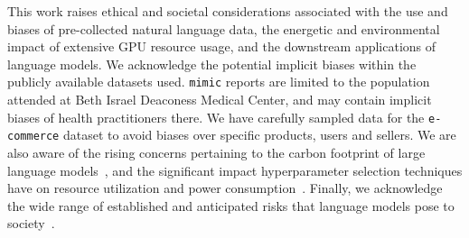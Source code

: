 \documentclass{article}
\begin{document}
This work raises ethical and societal considerations associated with
the use and biases of pre-collected natural language data,
the energetic and environmental impact of extensive GPU resource usage,
and the downstream applications of language models.
%
We acknowledge the potential implicit biases within the publicly available datasets used.
\Eg \texttt{mimic} reports are limited to the population attended at Beth Israel Deaconess Medical Center,
and may contain implicit biases of health practitioners there.
We have carefully sampled data for the \texttt{e-commerce} dataset to avoid biases over specific products, users and sellers.
%
We are also aware of the rising concerns pertaining to the carbon footprint of large language models~\citep{patterson2021carbon},
and the significant impact hyperparameter selection techniques have on resource utilization and power consumption~\citep{puvis-de-chavannes-etal-2021-hyperparameter}.
Finally, we acknowledge the wide range of established and anticipated risks that language models pose to society~\citep{j-Weidinger2021}.

\end{document}
